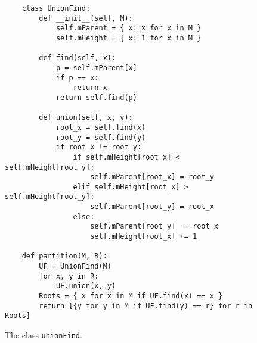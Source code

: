 \begin{figure}[!ht]
\centering
\begin{verbatim}
    class UnionFind:
        def __init__(self, M):
            self.mParent = { x: x for x in M }
            self.mHeight = { x: 1 for x in M }
            
        def find(self, x):
            p = self.mParent[x]
            if p == x:
                return x
            return self.find(p)

        def union(self, x, y):
            root_x = self.find(x)
            root_y = self.find(y)
            if root_x != root_y:
                if self.mHeight[root_x] < self.mHeight[root_y]:
                    self.mParent[root_x] = root_y
                elif self.mHeight[root_x] > self.mHeight[root_y]:
                    self.mParent[root_y] = root_x
                else:
                    self.mParent[root_y]  = root_x
                    self.mHeight[root_x] += 1
                    
    def partition(M, R):
        UF = UnionFind(M)
        for x, y in R:
            UF.union(x, y)
        Roots = { x for x in M if UF.find(x) == x }
        return [{y for y in M if UF.find(y) == r} for r in Roots]
\end{verbatim}
\vspace*{-0.3cm}
\caption{The class \texttt{unionFind}.}
\label{fig:Union-Find-OO.ipynb}
\end{figure}

